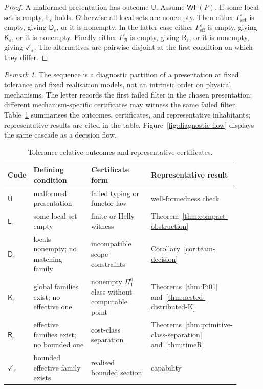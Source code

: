 \documentclass[11pt]{article}
\theoremstyle{plain}
\theoremstyle{definition}
\theoremstyle{remark}
\newtheorem{remark}[theorem]{Remark}
\newcommand{\eps}{\varepsilon}
\begin{document}
\begin{proof}
A malformed presentation has outcome $\mathsf U$. Assume $\mathsf{WF}(P)$.
If some local set is empty, $\mathsf L_\eps$ holds. Otherwise all local sets are
nonempty. Then either $\Gamma_{\mathrm{set}}^\eps$ is empty, giving
$\mathsf D_\eps$, or it is nonempty. In the latter case either
$\Gamma_{\mathrm{eff}}^\eps$ is empty, giving $\mathsf K_\eps$, or it is
nonempty. Finally either $\Gamma_{\mathcal B}^\eps$ is empty, giving
$\mathsf R_\eps$, or it is nonempty, giving $\checkmark_\eps$. The alternatives
are pairwise disjoint at the first condition on which they differ.
\end{proof}

\begin{remark}\label{rem:ladder}
The sequence is a diagnostic partition of a presentation at fixed tolerance and
fixed realisation models, not an intrinsic order on physical mechanisms. The
letter records the first failed filter in the chosen presentation; different
mechanism-specific certificates may witness the same failed filter.
Table~\ref{tab:ladder} summarises the outcomes, certificates, and representative inhabitants; representative results are cited in the table.
Figure~\ref{fig:diagnostic-flow} displays the same cascade as a decision flow.
\end{remark}

\begin{table}[htbp]
\centering
\caption{Tolerance-relative outcomes and representative certificates.}
\label{tab:ladder}
\begin{tabular}{@{}p{0.09\linewidth}p{0.27\linewidth}p{0.28\linewidth}p{0.26\linewidth}@{}}
\toprule
Code & Defining condition & Certificate form & Representative result\\
\midrule
$\mathsf U$ & malformed presentation & failed typing or functor law & well-formedness check\\
$\mathsf L_\eps$ & some local set empty & finite or Helly witness & Theorem~\ref{thm:compact-obstruction}\\
$\mathsf D_\eps$ & locals nonempty; no matching family & incompatible scope constraints & Corollary~\ref{cor:team-decision}\\
$\mathsf K_\eps$ & global families exist; no effective one & nonempty $\Pi^0_1$ class without computable point & Theorems~\ref{thm:Pi01} and~\ref{thm:nested-distributed-K}\\
$\mathsf R_\eps$ & effective families exist; no bounded one & cost-class separation & Theorems~\ref{thm:primitive-class-separation} and~\ref{thm:timeR}\\
$\checkmark_\eps$ & bounded effective family exists & realised bounded section & capability\\
\bottomrule
\end{tabular}
\end{table}
\end{document}
